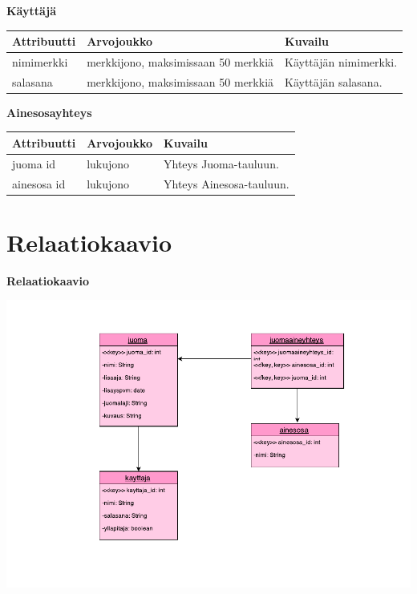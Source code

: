 \documentclass[a4paper]{article}
\begin{document}
\begin{flushleft}\textbf{Käyttäjä} \end{flushleft}
\begin{flushleft}
	\begin{tabular}{|l|l|l|}
			\hline
			Attribuutti & Arvojoukko & Kuvailu   \\ 
			\hline
			nimimerkki  & merkkijono, maksimissaan 50 merkkiä & Käyttäjän nimimerkki. \\ 
			\hline
			salasana    & merkkijono, maksimissaan 50 merkkiä & Käyttäjän salasana.   \\ 
			\hline
	\end{tabular}
\end{flushleft}

\begin{flushleft}\textbf{Ainesosayhteys} \end{flushleft}
\begin{flushleft}
	\begin{tabular}{|l|l|l|}
			\hline
			Attribuutti & Arvojoukko & Kuvailu   \\ 
			\hline
			juoma id  & lukujono & Yhteys Juoma-tauluun. \\ 
			\hline
			ainesosa id    & lukujono & Yhteys Ainesosa-tauluun.  \\ 
			\hline
	\end{tabular}
\end{flushleft}

\section{Relaatiokaavio}
\begin{flushleft}\textbf{Relaatiokaavio} \end{flushleft}

\includegraphics[scale=0.8]{relaatiokaavio.pdf}
\end{document}

